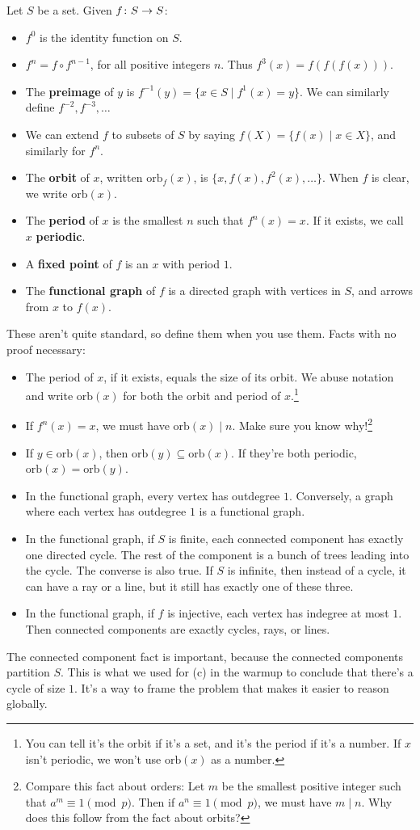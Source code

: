 \documentclass[11pt,paper=letter]{scrartcl}
\newcommand{\orb}[1]{\mathrm{orb}(#1)}
\newcommand{\orbf}[2]{\mathrm{orb}_{#1}(#2)}
\begin{document}
Let $S$ be a set. Given $f \colon S \to S$:
\begin{itemize}
\item $f^0$ is the identity function on $S$.
\item $f^n = f \circ f^{n-1}$, for all positive integers $n$. Thus $f^3(x) = f(f(f(x)))$.
\item The \textbf{preimage} of $y$ is $f^{-1}(y) = \{x \in S \mid f^1(x) = y\}$. We can similarly define $f^{-2}, f^{-3}, \ldots$
\item We can extend $f$ to subsets of $S$ by saying $f(X) = \{ f(x) \mid x \in X \}$, and similarly for $f^n$.
\item The \textbf{orbit} of $x$, written $\orbf{f}{x}$, is $\{x, f(x), f^2(x), \ldots\}$. When $f$ is clear, we write $\orb{x}$.
\item The \textbf{period} of $x$ is the smallest $n$ such that $f^n(x) = x$. If it exists, we call $x$ \textbf{periodic}.
\item A \textbf{fixed point} of $f$ is an $x$ with period $1$.
\item The \textbf{functional graph} of $f$ is a directed graph with vertices in $S$, and arrows from $x$ to $f(x)$.
\end{itemize}
\vspace{\itemsep}
These aren't quite standard, so define them when you use them. Facts with no proof necessary:
\begin{itemize}
\item The period of $x$, if it exists, equals the size of its orbit. We abuse notation and write $\orb{x}$ for both the orbit and period of $x$.\footnote{You can tell it's the orbit if it's a set, and it's the period if it's a number. If $x$ isn't periodic, we won't use $\orb{x}$ as a number.}
\item If $f^n(x) = x$, we must have $\orb{x} \mid n$. Make sure you know why!\footnote{Compare this fact about orders: Let $m$ be the smallest positive integer such that $a^m \equiv 1 \pmod p$. Then if $a^n \equiv 1 \pmod p$, we must have $m \mid n$. Why does this follow from the fact about orbits?}
\item If $y \in \orb{x}$, then $\orb{y} \subseteq \orb{x}$. If they're both periodic, $\orb{x} = \orb{y}$.
\item In the functional graph, every vertex has outdegree $1$. Conversely, a graph where each vertex has outdegree $1$ is a functional graph.
\item In the functional graph, if $S$ is finite, each connected component has exactly one directed cycle. The rest of the component is a bunch of trees leading into the cycle. The converse is also true. If $S$ is infinite, then instead of a cycle, it can have a ray or a line, but it still has exactly one of these three.
\item In the functional graph, if $f$ is injective, each vertex has indegree at most $1$. Then connected components are exactly cycles, rays, or lines.
\end{itemize}
The connected component fact is important, because the connected components partition $S$. This is what we used for (c) in the warmup to conclude that there's a cycle of size $1$. It's a way to frame the problem that makes it easier to reason globally.
\end{document}
